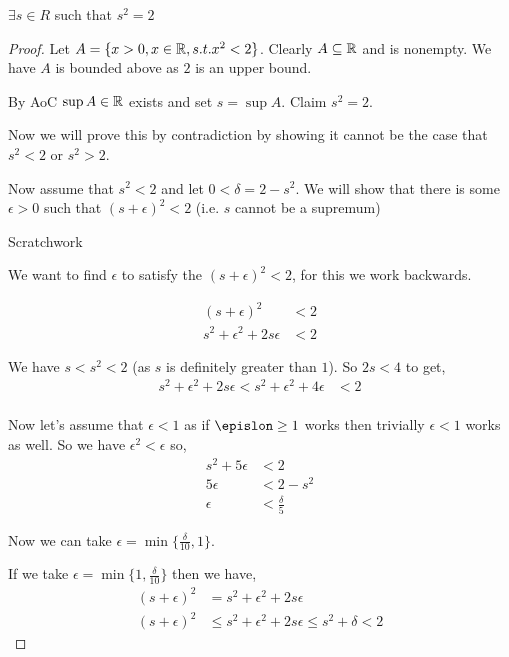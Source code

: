 \begin{theorem}
    $\exists s \in R$ such that $s^2  = 2$
\end{theorem}
\begin{proof}
    Let $A = \{x > 0, x \in \mathbb{R}, s.t. x^2 < 2\}$. Clearly $A \subseteq \mathbb{R}$ and is nonempty. We have $A$ is bounded above as $2$ is an upper bound.
 
    By AoC $\sup A \in \mathbb{R}$  exists and set  $s = \sup A$. Claim  $s^2 = 2$.  

    Now we will prove this by contradiction by showing it cannot be the case that $s^2 < 2 $ or $s^2 > 2$. 

    Now assume that $s^2 < 2$ and let $0 < \delta = 2 - s^2$. We will show that there is some $\epsilon > 0$ such that  $(s + \epsilon)^2 < 2$ (i.e. $s$ cannot be a supremum)
    \begin{swork}[10cm]
        Scratchwork

        We want to find $\epsilon$ to satisfy the  $(s + \epsilon)^2 < 2$, for this we work backwards.

        \begin{align*}
            (s + \epsilon)^2 &< 2\\
            s^2 + \epsilon^2 + 2s\epsilon &< 2
        \end{align*}

        We have $s < s^2 < 2$ (as $s$ is definitely greater than $1$). So $2s < 4$ to get,  
        \begin{align*}
            s^2 + \epsilon^2 + 2s\epsilon <  s^2 + \epsilon^2 + 4\epsilon  &< 2\\
        \end{align*}

        Now let's assume that $\epsilon < 1$ as if  $\epislon \ge 1$ works then trivially  $\epsilon < 1$ works as well. So we have  $\epsilon^2 < \epsilon$ so, 
        \begin{align*}
            s^2 + 5\epsilon &< 2    \\
                            5\epsilon &< 2 - s^2\\
                            \epsilon &< \frac{\delta}{5}
        \end{align*}

        Now we can take $\epsilon = \min \{\frac{\delta}{10}, 1\}$.
    \end{swork}


    If we take $\epsilon = \min \{ 1, \frac{\delta}{10}\}$  then we have, 
    \begin{align*}
        (s + \epsilon)^2 &= s^2 + \epsilon^2 + 2s\epsilon\\
        (s + \epsilon)^2  &\le s^2 +   \epsilon^2 + 2s\epsilon  \le s^2 + \delta < 2
    \end{align*}


\end{proof}


